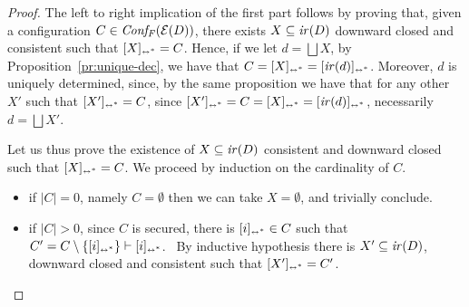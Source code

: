 \begin{proof}
  The left to right implication {of the first part} follows by proving that, given a
  configuration $C \in \mathit{Conf_F}({\mathcal{E}({D})})$, there exists
  $X \subseteq \mathop{\mathit{ir}({D})}$ downward closed and consistent such that
  $[{X}]_{\scriptscriptstyle {\leftrightarrow^*}} = C$. Hence, if we let $d = \bigsqcup X$, by
  Proposition~\ref{pr:unique-dec}, we have that
  $C = [{X}]_{\scriptscriptstyle {\leftrightarrow^*}} = [{\mathop{\mathit{ir}({d})}}]_{\scriptscriptstyle {\leftrightarrow^*}}$. Moreover, $d$ is uniquely
  determined, since, by the same proposition we have that for any
  other $X'$ such that $[{X'}]_{\scriptscriptstyle {\leftrightarrow^*}} = C$, since
  $[{X'}]_{\scriptscriptstyle {\leftrightarrow^*}} = C = [{X}]_{\scriptscriptstyle {\leftrightarrow^*}} = [{\mathop{\mathit{ir}({d})}}]_{\scriptscriptstyle {\leftrightarrow^*}}$,
  necessarily $d = \bigsqcup X'$.
  

  Let us thus prove the existence of $X \subseteq \mathop{\mathit{ir}({D})}$ consistent
  and downward closed such that $[{X}]_{\scriptscriptstyle {\leftrightarrow^*}} = C$.  
  We proceed by induction on the cardinality of $C$.

  
  \begin{itemize}
  \item if $|C| = 0$, namely $C = \emptyset$ then we can take $X= \emptyset$,
    and trivially conclude.

  \item if $|C|>0$, since $C$ is secured, there is
    $[{i}]_{\scriptscriptstyle {\leftrightarrow^*}} \in C$ such that
    $C' = C \setminus \{ [{i}]_{\scriptscriptstyle {\leftrightarrow^*}} \} \vdash [{i}]_{\scriptscriptstyle {\leftrightarrow^*}}$.\
    By inductive hypothesis there is $X' \subseteq \mathop{\mathit{ir}({D})}$, downward
    closed and consistent such that $[{X'}]_{\scriptscriptstyle {\leftrightarrow^*}} = C'$.


\end{itemize}
\end{proof}
